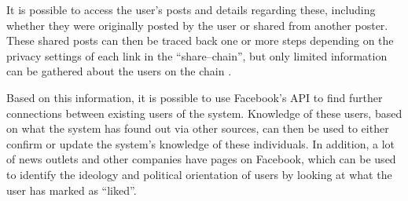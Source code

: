 It is possible to access the user's posts and details regarding these, including whether they were originally
posted by the user or shared from another poster.
These shared posts can then be traced back one or more steps depending on the
privacy settings of each link in the ``share--chain'', but only limited
information can be gathered about the users on the chain \citep{FacebookGraphApiUserFeed}.\nl

Based on this information, it is possible to use Facebook's \ac{API} to find
further connections between existing users of the system.
Knowledge of these users, based on what the system has found out via other
sources, can then be used to either confirm or update the system's knowledge of
these individuals.
In addition, a lot of news outlets and other companies have pages on Facebook,
which can be used to identify the ideology and political orientation of
users by looking at what the user has marked as ``liked''.
